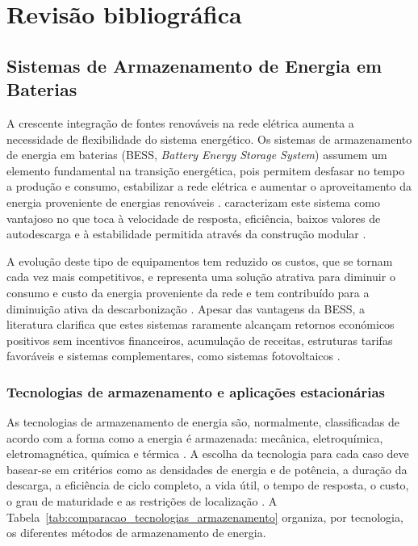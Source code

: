 
\chapter{Revisão bibliográfica}	%
\label{Chapter2}	%



\section{Sistemas de Armazenamento de Energia em Baterias}
\label{sec:Ch2.1}

A crescente integração de fontes renováveis na rede elétrica aumenta a necessidade de flexibilidade do sistema energético. Os sistemas de armazenamento de energia em baterias (BESS, \textit{Battery Energy Storage System}) assumem um elemento fundamental na transição energética, pois permitem desfasar no tempo a produção e consumo, estabilizar a rede elétrica e aumentar o aproveitamento da energia proveniente de energias renováveis \cite{enel_bess} \cite{ Shamarova2022}. \textcite{ Hesse2017}caracterizam este sistema como vantajoso no que toca à velocidade de resposta, eficiência, baixos valores de autodescarga e à estabilidade permitida através da construção modular \cite{ Hesse2017}.

A evolução deste tipo de equipamentos tem reduzido os custos, que se tornam cada vez mais competitivos, e representa uma solução atrativa para diminuir o consumo e custo da energia proveniente da rede e tem contribuído para a diminuição ativa da descarbonização \cite{enel_bess} \cite{ Shamarova2022}. Apesar das vantagens da BESS, a literatura clarifica que estes sistemas raramente alcançam retornos económicos positivos sem incentivos financeiros, acumulação de receitas, estruturas tarifas favoráveis e sistemas complementares, como sistemas fotovoltaicos \cite{ Dratsas2022}.


\subsection{Tecnologias de armazenamento e aplicações estacionárias}
\label{sec:Ch2.1.1}

As tecnologias de armazenamento de energia são, normalmente, classificadas de acordo com a forma como a energia é armazenada: mecânica, eletroquímica, eletromagnética, química e térmica \cite{ Balwani2021} \cite{Mahlia2014}.  A escolha da tecnologia para cada caso deve basear-se em critérios como as densidades de energia e de potência, a duração da descarga, a eficiência de ciclo completo, a vida útil, o tempo de resposta, o custo, o grau de maturidade e as restrições de localização \cite{Mahlia2014} \cite{Luo2015}. A Tabela~\ref{tab:comparacao_tecnologias_armazenamento} organiza, por tecnologia, os diferentes métodos de armazenamento de energia.



